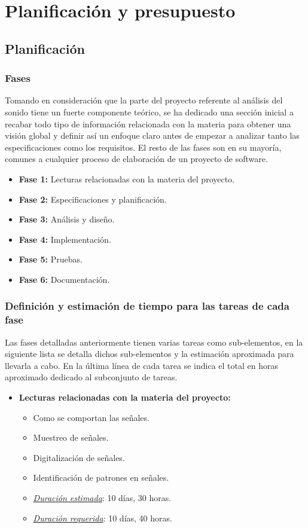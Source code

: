 \chapter{Planificación y presupuesto}
\label{chap3}


\section{Planificación}

\subsection{Fases}
Tomando en consideración que la parte del proyecto referente al análisis del sonido tiene un fuerte componente teórico, se ha dedicado una sección inicial a recabar todo tipo de información relacionada con la materia para obtener una visión global y definir así un enfoque claro antes de empezar a analizar tanto las especificaciones como los requisitos. El resto de las fases son en su mayoría, comunes a cualquier proceso de elaboración de un proyecto de software.

\begin{itemize}
  \item \textbf{Fase 1:} Lecturas relacionadas con la materia del proyecto.
  \item \textbf{Fase 2:} Especificaciones y planificación.
  \item \textbf{Fase 3:} Análisis y diseño.
  \item \textbf{Fase 4:} Implementación.
  \item \textbf{Fase 5:} Pruebas.
  \item \textbf{Fase 6:} Documentación.
\end{itemize}

\newpage
\subsection{Definición y estimación de tiempo para las tareas de cada fase}

Las fases detalladas anteriormente tienen varias tareas como sub-elementos, en la siguiente lista se detalla dichos sub-elementos y la estimación aproximada para llevarla a cabo. En la última línea de cada tarea se indica el total en horas aproximado dedicado al subconjunto de tareas.

\begin{itemize}
   \item \textbf{Lecturas relacionadas con la materia del proyecto:}
   \begin{itemize}
    \item Como se comportan las señales.
    \item Muestreo de señales.
    \item Digitalización de señales.
    \item Identificación de patrones en señales.
    \item \underline{\textit{Duración estimada}}: 10 días, 30 horas.
    \item \underline{\textit{Duración requerida}}: 10 días, 40 horas.
    \end{itemize}
\end{itemize}

